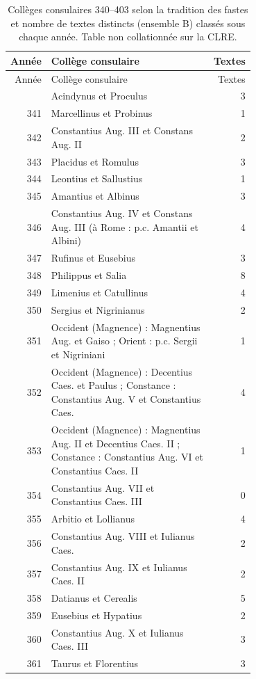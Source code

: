 \begin{longtable}{@{}r p{0.70\linewidth} r@{}}
\caption{Collèges consulaires 340–403 selon la tradition des fastes et nombre de textes distincts (ensemble B) classés sous chaque année. Table non collationnée sur la CLRE.}\label{tab:fastes}\\
\toprule Année & Collège consulaire & Textes\\\midrule\endfirsthead
\toprule Année & Collège consulaire & Textes\\\midrule\endhead
\bottomrule\endfoot
340 & Acindynus et Proculus & 3 \\
341 & Marcellinus et Probinus & 1 \\
342 & Constantius Aug. III et Constans Aug. II & 2 \\
343 & Placidus et Romulus & 3 \\
344 & Leontius et Sallustius & 1 \\
345 & Amantius et Albinus & 3 \\
346 & Constantius Aug. IV et Constans Aug. III (à Rome : p.c. Amantii et Albini) & 4 \\
347 & Rufinus et Eusebius & 3 \\
348 & Philippus et Salia & 8 \\
349 & Limenius et Catullinus & 4 \\
350 & Sergius et Nigrinianus & 2 \\
351 & Occident (Magnence) : Magnentius Aug. et Gaiso ; Orient : p.c. Sergii et Nigriniani & 1 \\
352 & Occident (Magnence) : Decentius Caes. et Paulus ; Constance : Constantius Aug. V et Constantius Caes. & 4 \\
353 & Occident (Magnence) : Magnentius Aug. II et Decentius Caes. II ; Constance : Constantius Aug. VI et Constantius Caes. II & 1 \\
354 & Constantius Aug. VII et Constantius Caes. III & 0 \\
355 & Arbitio et Lollianus & 4 \\
356 & Constantius Aug. VIII et Iulianus Caes. & 2 \\
357 & Constantius Aug. IX et Iulianus Caes. II & 2 \\
358 & Datianus et Cerealis & 5 \\
359 & Eusebius et Hypatius & 2 \\
360 & Constantius Aug. X et Iulianus Caes. III & 3 \\
361 & Taurus et Florentius & 3 \\

\end{longtable}
